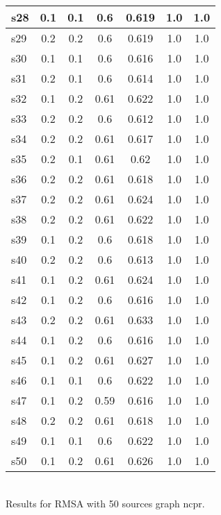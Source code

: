 \documentclass{article}
\begin{document}
\begin{tabular}{|l|c|c|c|c|c|c|}
\hline
s28 &0.1 & 0.1 & 0.6 & 0.619 & 1.0 & 1.0\\
\hline
s29 &0.2 & 0.2 & 0.6 & 0.619 & 1.0 & 1.0\\
\hline
s30 &0.1 & 0.1 & 0.6 & 0.616 & 1.0 & 1.0\\
\hline
s31 &0.2 & 0.1 & 0.6 & 0.614 & 1.0 & 1.0\\
\hline
s32 &0.1 & 0.2 & 0.61 & 0.622 & 1.0 & 1.0\\
\hline
s33 &0.2 & 0.2 & 0.6 & 0.612 & 1.0 & 1.0\\
\hline
s34 &0.2 & 0.2 & 0.61 & 0.617 & 1.0 & 1.0\\
\hline
s35 &0.2 & 0.1 & 0.61 & 0.62 & 1.0 & 1.0\\
\hline
s36 &0.2 & 0.2 & 0.61 & 0.618 & 1.0 & 1.0\\
\hline
s37 &0.2 & 0.2 & 0.61 & 0.624 & 1.0 & 1.0\\
\hline
s38 &0.2 & 0.2 & 0.61 & 0.622 & 1.0 & 1.0\\
\hline
s39 &0.1 & 0.2 & 0.6 & 0.618 & 1.0 & 1.0\\
\hline
s40 &0.2 & 0.2 & 0.6 & 0.613 & 1.0 & 1.0\\
\hline
s41 &0.1 & 0.2 & 0.61 & 0.624 & 1.0 & 1.0\\
\hline
s42 &0.1 & 0.2 & 0.6 & 0.616 & 1.0 & 1.0\\
\hline
s43 &0.2 & 0.2 & 0.61 & 0.633 & 1.0 & 1.0\\
\hline
s44 &0.1 & 0.2 & 0.6 & 0.616 & 1.0 & 1.0\\
\hline
s45 &0.1 & 0.2 & 0.61 & 0.627 & 1.0 & 1.0\\
\hline
s46 &0.1 & 0.1 & 0.6 & 0.622 & 1.0 & 1.0\\
\hline
s47 &0.1 & 0.2 & 0.59 & 0.616 & 1.0 & 1.0\\
\hline
s48 &0.2 & 0.2 & 0.61 & 0.618 & 1.0 & 1.0\\
\hline
s49 &0.1 & 0.1 & 0.6 & 0.622 & 1.0 & 1.0\\
\hline
s50 &0.1 & 0.2 & 0.61 & 0.626 & 1.0 & 1.0\\
\hline
\end{tabular}\\

\noindent Results for RMSA with 50 sources graph ncpr.
\end{document}
